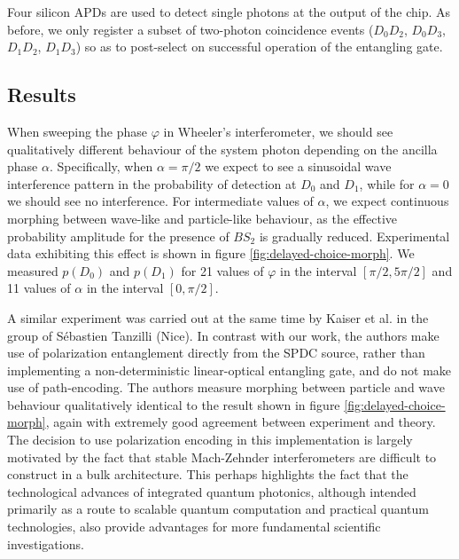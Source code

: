 Four silicon APDs are used to detect single photons at the output of the chip. As before, we only register a subset of two-photon coincidence events ($D_0D_2$, $D_0D_3$, $D_1D_2$, $D_1D_3$) so as to post-select on successful operation of the entangling gate.


\subsection{Results} 

When sweeping the phase $\varphi$ in Wheeler's interferometer, we should see qualitatively different behaviour of the system photon depending on the ancilla phase $\alpha$. Specifically, when $\alpha = \pi/2$ we expect to see a sinusoidal wave interference pattern in the probability of detection at $D_0$ and $D_1$, while for $\alpha=0$ we should see no interference. For intermediate values of $\alpha$, we expect continuous morphing between wave-like and particle-like behaviour, as the effective probability amplitude for the presence of $BS_2$ is gradually reduced. Experimental data exhibiting this effect is shown in figure \ref{fig:delayed-choice-morph}. We measured $p(D_0)$ and $p(D_1)$ for 21 values of $\varphi$ in the interval $\left[\pi/2, 5\pi/2\right]$ and 11 values of $\alpha$ in the interval $\left[0, \pi/2\right]$.

A similar experiment was carried out at the same time \cite{Kaiser2012} by Kaiser et al. in the group of S\'ebastien Tanzilli (Nice). In contrast with our work, the authors make use of polarization entanglement directly from the SPDC source, rather than implementing a non-deterministic linear-optical entangling gate, and do not make use of path-encoding. The authors measure morphing between particle and wave behaviour qualitatively identical to the result shown in figure \ref{fig:delayed-choice-morph}, again with extremely good agreement between experiment and theory.  The decision to use polarization encoding in this implementation is largely motivated by the fact that stable Mach-Zehnder interferometers are difficult to construct in a bulk architecture. This perhaps highlights the fact that the technological advances of integrated quantum photonics, although intended primarily as a route to scalable quantum computation and practical quantum technologies, also provide advantages for more fundamental scientific investigations.

